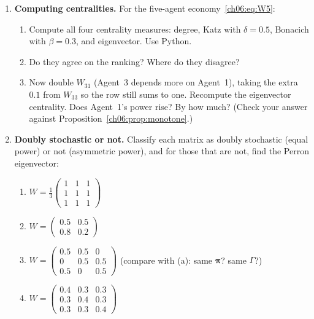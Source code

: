 \documentclass[../structural_economics_book.tex]{subfiles}
\begin{document}
\begin{enumerate}[label=\textbf{6.\arabic*}, leftmargin=3em]

\item \textbf{Computing centralities.} For the five-agent economy~\eqref{ch06:eq:W5}:
\begin{enumerate}
\item Compute all four centrality measures: degree, Katz with $\delta = 0.5$, Bonacich with $\beta = 0.3$, and eigenvector. Use Python.
\item Do they agree on the ranking? Where do they disagree?
\item Now double $W_{31}$ (Agent~3 depends more on Agent~1), taking the extra $0.1$ from $W_{33}$ so the row still sums to one. Recompute the eigenvector centrality. Does Agent~1's power rise? By how much? (Check your answer against Proposition~\ref{ch06:prop:monotone}.)
\end{enumerate}

\item \textbf{Doubly stochastic or not.} Classify each matrix as doubly stochastic (equal power) or not (asymmetric power), and for those that are not, find the Perron eigenvector:
\begin{enumerate}
\item $W = \frac{1}{3}\begin{pmatrix} 1 & 1 & 1 \\ 1 & 1 & 1 \\ 1 & 1 & 1 \end{pmatrix}$
\item $W = \begin{pmatrix} 0.5 & 0.5 \\ 0.8 & 0.2 \end{pmatrix}$
\item $W = \begin{pmatrix} 0.5 & 0.5 & 0 \\ 0 & 0.5 & 0.5 \\ 0.5 & 0 & 0.5 \end{pmatrix}$ (compare with (a): same $\boldsymbol{\pi}$? same $\Gamma$?)
\item $W = \begin{pmatrix} 0.4 & 0.3 & 0.3 \\ 0.3 & 0.4 & 0.3 \\ 0.3 & 0.3 & 0.4 \end{pmatrix}$
\end{enumerate}


\end{enumerate}
\end{document}
